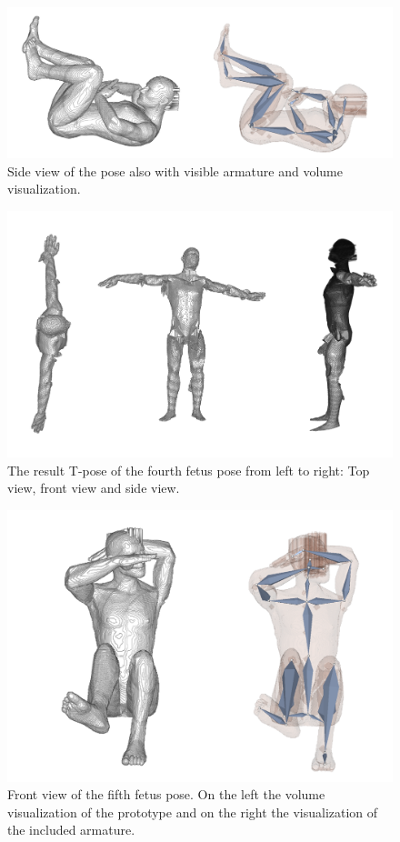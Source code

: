 \begin{figure} [htb!]
    \centering
	\includegraphics[width=15cm]{content/images/results/man4Side.png}
	\caption{Side view of the pose also with visible armature and volume visualization.}
	\label{fig:}
\end{figure}
\vspace*{3cm}
\begin{figure} [htb!]
    \centering
	\includegraphics[width=16cm]{content/images/results/man4Result.png}
	\caption{The result T-pose of the fourth fetus pose from left to right: Top view, front view and side view.}
	\label{fig:}
\end{figure}
\newpage
\begin{figure} [htb!]
    \centering
	\includegraphics[width=13cm]{content/images/results/man5Front.png}
	\caption{Front view of the fifth fetus pose. On the left the volume visualization of the prototype and on the right the visualization of the included armature.}
	\label{fig:}
\end{figure}
